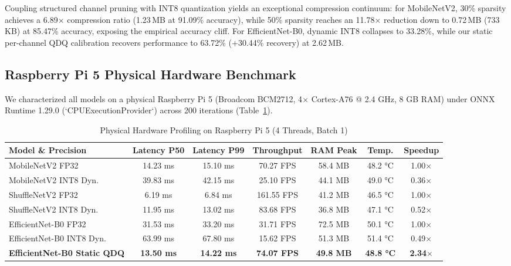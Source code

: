 \documentclass[11pt,a4paper]{article}
\begin{document}
Coupling structured channel pruning with INT8 quantization yields an exceptional compression continuum: for MobileNetV2, 30\% sparsity achieves a 6.89$\times$ compression ratio (1.23\,MB at 91.09\% accuracy), while 50\% sparsity reaches an 11.78$\times$ reduction down to 0.72\,MB (733\,KB) at 85.47\% accuracy, exposing the empirical accuracy cliff. For EfficientNet-B0, dynamic INT8 collapses to 33.28\%, while our static per-channel QDQ calibration recovers performance to 63.72\% (+30.44\% recovery) at 2.62\,MB.

\subsection{Raspberry Pi 5 Physical Hardware Benchmark}
We characterized all models on a physical Raspberry Pi 5 (Broadcom BCM2712, 4$\times$ Cortex-A76 @ 2.4 GHz, 8 GB RAM) under ONNX Runtime 1.29.0 (`CPUExecutionProvider`) across 200 iterations (Table~\ref{tab:hardware}).

\begin{table}[htbp]
\centering
\caption{Physical Hardware Profiling on Raspberry Pi 5 (4 Threads, Batch 1)}
\label{tab:hardware}
\small
\begin{tabular}{lcccccc}
\toprule
\textbf{Model \& Precision} & \textbf{Latency P50} & \textbf{Latency P99} & \textbf{Throughput} & \textbf{RAM Peak} & \textbf{Temp.} & \textbf{Speedup} \\
\midrule
MobileNetV2 FP32 & 14.23 ms & 15.10 ms & 70.27 FPS & 58.4 MB & 48.2 °C & 1.00$\times$ \\
MobileNetV2 INT8 Dyn. & 39.83 ms & 42.15 ms & 25.10 FPS & 44.1 MB & 49.0 °C & 0.36$\times$ \\
ShuffleNetV2 FP32 & 6.19 ms & 6.84 ms & 161.55 FPS & 41.2 MB & 46.5 °C & 1.00$\times$ \\
ShuffleNetV2 INT8 Dyn. & 11.95 ms & 13.02 ms & 83.68 FPS & 36.8 MB & 47.1 °C & 0.52$\times$ \\
EfficientNet-B0 FP32 & 31.53 ms & 33.20 ms & 31.71 FPS & 72.5 MB & 50.1 °C & 1.00$\times$ \\
EfficientNet-B0 INT8 Dyn. & 63.99 ms & 67.80 ms & 15.62 FPS & 51.3 MB & 51.4 °C & 0.49$\times$ \\
\textbf{EfficientNet-B0 Static QDQ} & \textbf{13.50 ms} & \textbf{14.22 ms} & \textbf{74.07 FPS} & \textbf{49.8 MB} & \textbf{48.8 °C} & \textbf{2.34$\times$} \\
\bottomrule
\end{tabular}
\end{table}
\end{document}

